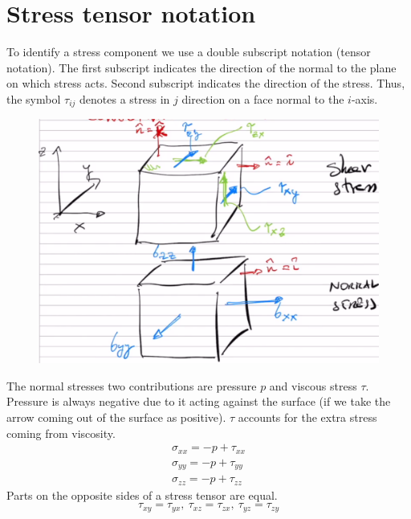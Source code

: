 \documentclass[class=report, crop=false, 12pt,a4paper]{standalone}
\begin{document}
\section{Stress tensor notation}
To identify a stress component we use a double subscript notation (tensor notation). The first subscript indicates the direction of the normal to the plane on which stress acts. Second subscript indicates the direction of the stress. Thus, the symbol $\tau_{ij}$ denotes a stress in $j$ direction on a face normal to the $i$-axis.
\begin{figure}[H]
  \centering
  \includegraphics[width = 0.8 \textwidth]{../img/tensorforces.png}
\end{figure}
The normal stresses two contributions are pressure $p$ and viscous stress $\tau$. Pressure is always negative due to it acting against the surface (if we take the arrow coming out of the surface as positive). $\tau$ accounts for the extra stress coming from viscosity.
\begin{gather}
  \sigma_{xx} = -p + \tau_{xx}\\
  \sigma_{yy} = -p + \tau_{yy}\\
  \sigma_{zz} = -p + \tau_{zz}
\end{gather}
Parts on the opposite sides of a stress tensor are equal.
$$ \tau_{xy} = \tau_{yx}, \ \tau_{xz} = \tau_{zx}, \ \tau_{yz} = \tau_{zy} $$
\end{document}
